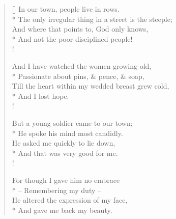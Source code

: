 \documentclass[MAIN]{subfiles}
\begin{document}
\settowidth{\versewidth}{\vin The only irregular thing in a street is the steeple;}
\begin{verse}[\versewidth]
In our town, people live in rows.\\* 
\vin The only irregular thing in a street is the steeple;\\
And where that points to, God only knows,\\*
\vin And not the poor disciplined people!\\!

And I have watched the women growing old,\\*
\vin Passionate about pins, \& pence, \& soap,\\
Till the heart within my wedded breast grew cold,\\*
\vin And I lost hope.\\!

But a young soldier came to our town;\\*
\vin He spoke his mind most candidly.\\
He asked me quickly to lie down,\\*
\vin And that was very good for me.\\!

For though I gave him no embrace\\*
\vin -- Remembering my duty --\\
He altered the expression of my face,\\*
\vin And gave me back my beauty.
\end{verse}
\end{document}
